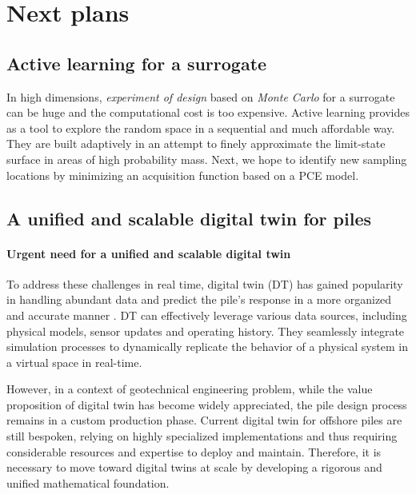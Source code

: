 \chapter{Next plans}

\label{Work_Plan}


\section{Active learning for a surrogate}
In high dimensions, \textit{experiment of design} based on \textit{Monte Carlo} for a surrogate can be huge and the computational cost is too expensive. Active learning provides as a tool to explore the random space in a sequential and much affordable way. They are built adaptively in an attempt to finely approximate the limit-state surface in areas of high probability mass. Next, we hope to identify new sampling locations by minimizing an acquisition function based on a \acrshort{PCE} model.





\section{A unified and scalable digital twin for piles}

\subsubsection{Urgent need for a unified and scalable digital twin}

To address these challenges in real time, digital twin (DT) has gained popularity in handling abundant data and predict the pile's response in a more organized and accurate manner \citep{wang2021}. DT can effectively leverage various data sources, including physical models, sensor updates and operating history. They seamlessly integrate simulation processes to dynamically replicate the behavior of a physical system in a virtual space in real-time. 


 However, in a context of geotechnical engineering problem, while the value proposition of digital twin has become widely appreciated, the pile design process remains in a custom production phase. Current digital twin for offshore piles are still bespoken, relying on highly specialized implementations and thus requiring considerable resources and expertise to deploy and maintain. Therefore, it is necessary to move toward digital twins at scale by developing a rigorous and unified mathematical foundation. 


